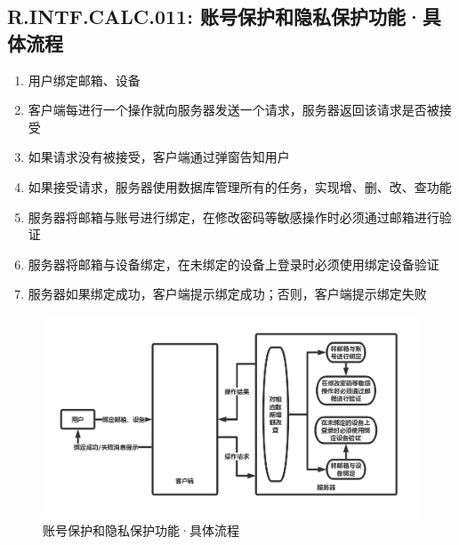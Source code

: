     \subsection{R.INTF.CALC.011: 账号保护和隐私保护功能·具体流程}
    \begin{enumerate}
        \item 用户绑定邮箱、设备
        \item 客户端每进行一个操作就向服务器发送一个请求，服务器返回该请求是否被接受
        \item 如果请求没有被接受，客户端通过弹窗告知用户
        \item 如果接受请求，服务器使用数据库管理所有的任务，实现增、删、改、查功能
        \item 服务器将邮箱与账号进行绑定，在修改密码等敏感操作时必须通过邮箱进行验证
        \item 服务器将邮箱与设备绑定，在未绑定的设备上登录时必须使用绑定设备验证
        \item 服务器如果绑定成功，客户端提示绑定成功；否则，客户端提示绑定失败
    \end{enumerate}
        \begin{figure}[h]
            \centering
            \includegraphics[scale=0.4]{OutlineDesign/figures/账号保护和隐私保护功能·具体流程.png}
            \caption{账号保护和隐私保护功能·具体流程}
            \label{fig:server_flow}
        \end{figure}
